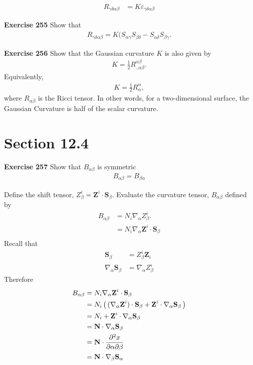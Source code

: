 \documentclass[12pt,a4paper]{report}
\begin{document}
\begin{description}
\begin{align*}
	R_{\gamma\delta\alpha\beta} &= K \varepsilon_{\gamma\delta\alpha\beta}
\end{align*}

\item \textbf{Exercise 255} Show that 
\begin{align*}
	R_{\gamma\delta\alpha\beta} = K(S_{\alpha\gamma}S_{\beta\delta}- S_{\alpha\delta}S_{\beta\gamma}.
\end{align*}

\item \textbf{Exercise 256} Show that the Gaussian curvature $K$ is also given by 
\begin{align*}
	K = \frac{1}{2}R^{\alpha\beta}_{..\alpha\beta}.
\end{align*}Equivalently,
\begin{align*}
	K = \frac{1}{2} R^\alpha_\alpha,
\end{align*}where $R_{\alpha\beta}$ is the Ricci tensor. In other words, for a two-dimensional surface, the Gaussian Curvature is half of the scalar curvature.

\section*{Section 12.4}
\item \textbf{Exercise 257} Show that $B_{\alpha\beta}$ is symmetric
\begin{align*}
	B_{\alpha\beta} = B_{\beta\alpha}
\end{align*}

Define the shift tensor, $Z^i_\beta = \textbf{Z}^i\cdot \textbf{S}_\beta$.  Evaluate the curvature tensor, $B_{\alpha\beta}$ defined by
\begin{align*}
	B_{\alpha\beta} &= N_i\nabla_\alpha Z^i_\beta. \\
		&= N_i\nabla_\alpha \textbf{Z}^i\cdot \textbf{S}_\beta \\
\end{align*}Recall that 
\begin{align*}
	\textbf{S}_\beta &= Z^i_\beta \textbf{Z}_i \\
	\nabla_\alpha \textbf{S}_\beta &= \nabla_\alpha Z^i_\beta
\end{align*}Therefore
\begin{align*}
	B_{\alpha\beta} &= N_i\nabla_\alpha \textbf{Z}^i\cdot \textbf{S}_\beta \\
		&= N_i \left (\,  (\nabla_\alpha \textbf{Z}^i)\cdot \textbf{S}_\beta + \textbf{Z}^i\cdot\nabla_\alpha \textbf{S}_\beta  \,\right ) \\
		&= N_i  + \textbf{Z}^i\cdot\nabla_\alpha \textbf{S}_\beta  \\
		&= \textbf{N}\cdot\nabla_\alpha \textbf{S}_\beta  \\
		&= \textbf{N}\cdot\frac{\partial^2 x}{\partial\alpha\partial\beta} \\
		&= \textbf{N}\cdot\nabla_\beta  \textbf{S}_\alpha \\
\end{align*}
	

\end{description}
\end{document}

